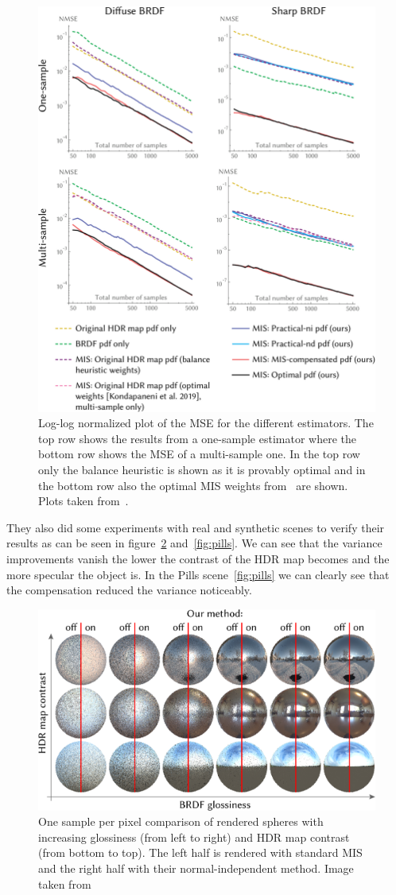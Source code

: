 \begin{figure}
    \centering
    \includegraphics[width=.7\textwidth]{images/error_plots.png}
    \caption{Log-log normalized plot of the MSE for the different estimators.
    The top row shows the results from a one-sample estimator where the bottom row shows the MSE of a multi-sample one.
    In the top row only the balance heuristic is shown as it is provably optimal
    and in the bottom row also the optimal MIS weights from~\cite{Kondapaneni2019} are shown.
    Plots taken from~\cite[Figure~6]{Karlik2019}.}
    \label{fig:error_plots}
\end{figure}

They also did some experiments with real and synthetic scenes to verify their results as can be seen in figure~\ref{fig:sphere_comparison} and~\ref{fig:pills}.
We can see that the variance improvements vanish the lower the contrast of the HDR map becomes and the more specular the object is.
In the Pills scene~\ref{fig:pills} we can clearly see that the compensation reduced the variance noticeably.

\begin{figure}
    \centering
    \includegraphics[width=.6\textwidth]{images/sphere_comparison.png}
    \caption{One sample per pixel comparison of rendered spheres with increasing glossiness (from left to right) and HDR map contrast (from bottom to top).
    The left half is rendered with standard MIS and the right half with their normal-independent method.
    Image taken from~\cite[Figure~7]{Karlik2019}}
    \label{fig:sphere_comparison}
\end{figure}

